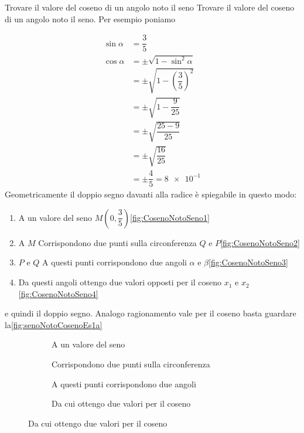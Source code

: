 \begin{esempiot}{Trovare il valore del coseno di un angolo noto il seno}{}
Trovare il valore del coseno di un angolo noto il seno. Per esempio poniamo 
\end{esempiot}
\begin{align*}
\sin\alpha&{}=\dfrac{3}{5}\\
\cos\alpha&=\pm\sqrt{1-\sin^2\alpha}\\
&=\pm\sqrt{1-\left(\dfrac{3}{5}\right)^2}\\
&=\pm\sqrt{1-\dfrac{9}{25}}\\
&=\pm\sqrt{\dfrac{25-9}{25}}\\
&=\pm\sqrt{\dfrac{16}{25}} \\
&=\pm\dfrac{4}{5}=\num{8e-1} 
\end{align*}
Geometricamente il doppio segno davanti alla radice è spiegabile in questo modo:
\begin{enumerate}
	\item A un valore del seno $M(0,\dfrac{3}{5})$\nobs\vref{fig:CosenoNotoSeno1}
	\item A $M$ Corrispondono due punti sulla circonferenza $Q$ e $P$\nobs\vref{fig:CosenoNotoSeno2}
	\item $P$ e $Q$ A questi punti corrispondono due angoli $\alpha$ e $\beta$\nobs\vref{fig:CosenoNotoSeno3}
	\item Da questi angoli ottengo due valori opposti per il coseno $x_1$ e $x_2$\nobs\vref{fig:CosenoNotoSeno4}
	\end{enumerate}
e quindi il doppio segno.
Analogo ragionamento vale per il coseno basta guardare la\nobs\vref{fig:senoNotoCosenoEs1a}
\begin{figure}
	\begin{subfigure}[b]{.5\linewidth}
		\centering
			\caption{A un valore del seno}\label{fig:CosenoNotoSeno1}
	\end{subfigure}%
	\begin{subfigure}[b]{.5\linewidth}
		\centering
			\caption{Corrispondono due punti sulla circonferenza}\label{fig:CosenoNotoSeno2}
	\end{subfigure}
	\begin{subfigure}[b]{.5\linewidth}
		\centering
			\caption{A questi punti corrispondono due angoli}\label{fig:CosenoNotoSeno3}
	\end{subfigure}%
	\begin{subfigure}[b]{.5\linewidth}
		\centering
			\caption{Da cui ottengo due valori per il coseno}\label{fig:CosenoNotoSeno4}
	\end{subfigure}
	\label{fig:CosenoNotoSenoEs1}
\end{figure}
